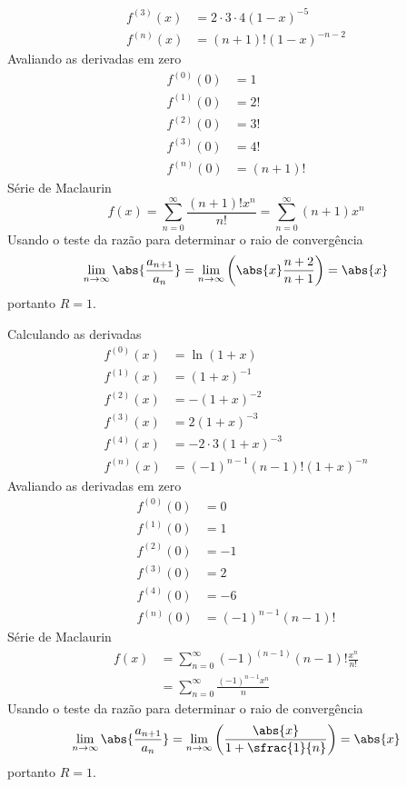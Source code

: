 \begin{exercises}
\begin{exercise}
\begin{answer}
\begin{alphalist}
\begin{align*}
  	f^{(3)}(x) & = 2 \cdot 3 \cdot 4(1-x)^{-5} \\
  	f^{(n)}(x) & = (n+1)!(1-x)^{-n-2}
  \end{align*}
  Avaliando as derivadas em zero
  \begin{align*}
    f^{(0)}(0) & = 1      \\
    f^{(1)}(0) & = 2!     \\
    f^{(2)}(0) & = 3!     \\
    f^{(3)}(0) & = 4!     \\
    f^{(n)}(0) & = (n+1)!
  \end{align*}
  Série de Maclaurin
  \[
    f(x) = \sum_{n=0}^\infty \frac{(n+1)! x^n}{n!}
         = \sum_{n=0}^\infty (n+1) x^n
  \]
  Usando o teste da razão para determinar o raio de convergência
  \[
    \lim_{n\to\infty}\abs{\frac{a_{n+1}}{a_n}} =
    \lim_{n\to\infty}\left(\abs{x}\frac{n+2}{n+1}\right)=\abs{x}
  \]
  portanto $R=1$.

  \item Calculando as derivadas
  \begin{align*}
  	f^{(0)}(x) & = \ln(1+x)                      \\
  	f^{(1)}(x) & = (1+x)^{-1}                    \\
  	f^{(2)}(x) & = -(1+x)^{-2}                   \\
  	f^{(3)}(x) & = 2(1+x)^{-3}                   \\
  	f^{(4)}(x) & = -2\cdot 3(1+x)^{-3}          \\
  	f^{(n)}(x) & = (-1)^{n-1} (n-1)! (1+x)^{-n}
  \end{align*}
  Avaliando as derivadas em zero
  \begin{align*}
  	f^{(0)}(0) & = 0                 \\
  	f^{(1)}(0) & = 1                 \\
  	f^{(2)}(0) & = -1                \\
  	f^{(3)}(0) & = 2                 \\
    f^{(4)}(0) & = -6                \\
  	f^{(n)}(0) & = (-1)^{n-1} (n-1)!
  \end{align*}
  Série de Maclaurin
  \begin{align*}
    f(x) & = \sum_{n=0}^\infty (-1)^{(n-1)} (n-1)! \frac{x^n}{n!} \\
         & = \sum_{n=0}^\infty \frac{(-1)^{n-1} x^n}{n}
  \end{align*}
  Usando o teste da razão para determinar o raio de convergência
  \[
    \lim_{n\to\infty}\abs{\frac{a_{n+1}}{a_n}} =
    \lim_{n\to\infty}\left(\frac{\abs{x}}{1+\sfrac{1}{n}}\right)=
    \abs{x}
  \]
  portanto $R=1$.


\end{alphalist}
\end{answer}
\end{exercise}
\end{exercises}
